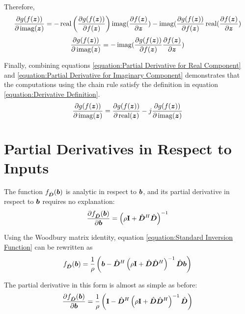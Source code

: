 \begin{appendices}
Therefore,
\begin{equation}
\frac{\partial g(f(\bm{z}))}{\partial \operatorname{imag}(\bm{z})} = -\operatorname{real}\left(\frac{\partial g(f(\bm{z}))}{\partial f(\bm{z})}\right)\operatorname{imag}(\frac{\partial f(\bm{z})}{\partial \bm{z}}) - \operatorname{imag}(\frac{\partial g(f(\bm{z}))}{\partial f(\bm{z})}\operatorname{real}(\frac{\partial f(\bm{z})}{\partial \bm{z}})
\end{equation}
\begin{equation} \label{equation:Partial Derivative for Imaginary Component}
\frac{\partial g(f(\bm{z}))}{\partial \operatorname{imag}(\bm{z})} = -\operatorname{imag}(\frac{\partial g(f(\bm{z}))}{\partial f(\bm{z})}\frac{\partial f(\bm{z})}{\partial \bm{z}})
\end{equation}

Finally, combining equations \ref{equation:Partial Derivative for Real Component} and \ref{equation:Partial Derivative for Imaginary Component} demonstrates that the computations using the chain rule satisfy the definition in equation \ref{equation:Derivative Definition}.
\begin{equation}
\frac{\partial g(f(\bm{z}))}{\partial \operatorname{imag}(\bm{z})} = \frac{\partial g(f(\bm{z}))}{\partial \operatorname{real}(\bm{z})} - j\frac{\partial g(f(\bm{z}))}{\partial \operatorname{imag}(\bm{z})}
\end{equation}


\section{Partial Derivatives in Respect to Inputs}
The function $f_{\hat{\bm{D}}}(\bm{b})$ is analytic in respect to $\bm{b}$, and its partial derivative in respect to $\bm{b}$ requires no explanation:
\begin{equation}
\frac{\partial f_{\hat{\bm{D}}}(\bm{b})}{\partial \bm{b}} = \left(\rho{\bf I} + \hat{\bm{D}}^H\hat{\bm{D}}\right)^{-1}
\end{equation}

Using the Woodbury matrix identity, equation \ref{equation:Standard Inversion Function} can be rewritten as
\begin{equation}
f_{\hat{\bm{D}}}(\bm{b}) = \frac{1}{\rho}\left(\bm{b} - \hat{\bm{D}}^H\left(\rho{\bf I} + \hat{\bm{D}}\hat{\bm{D}}^H\right)^{-1}\hat{\bm{D}}\bm{b}\right) \label{equation:Woodbury Inversion Function}
\end{equation}

The partial derivative in this form is almost as simple as before:
\begin{equation}
\frac{\partial f_{\hat{\bm{D}}}(\bm{b})}{\partial \bm{b}} = \frac{1}{\rho}\left({\bf I} - \hat{\bm{D}}^H\left(\rho{\bf I} + \hat{\bm{D}}\hat{\bm{D}}^H\right)^{-1}\hat{\bm{D}}\right)
\end{equation}


\end{appendices}
